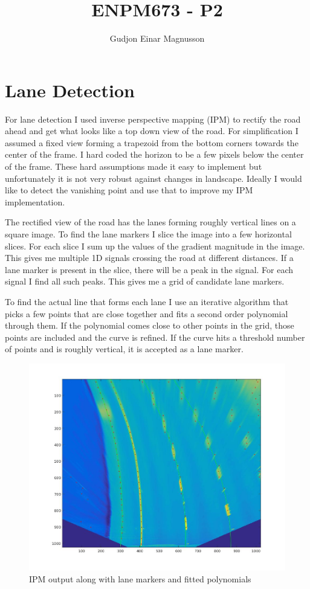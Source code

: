 \documentclass[12pt]{article}
\begin{document}
\title{ENPM673 - P2}
\author{Gudjon Einar Magnusson}

\maketitle

\section{Lane Detection}

For lane detection I used inverse perspective mapping (IPM) to rectify the road ahead and get what looks like a top down view of the road. For simplification I assumed a fixed view forming a trapezoid from the bottom corners towards the center of the frame. I hard coded the horizon to be a few pixels below the center of the frame. These hard assumptions made it easy to implement but unfortunately it is not very robust against changes in landscape. Ideally I would like to detect the vanishing point and use that to improve my IPM implementation.

The rectified view of the road has the lanes forming roughly vertical lines on a square image. To find the lane markers I slice the image into a few horizontal slices. For each slice I sum up the values of the gradient magnitude in the image. This gives me multiple 1D signals crossing the road at different distances. If a lane marker is present in the slice, there will be a peak in the signal. For each signal I find all such peaks. This gives me a grid of candidate lane markers.

To find the actual line that forms each lane I use an iterative algorithm that picks a few points that are close together and fits a second order polynomial through them. If the polynomial comes close to other points in the grid, those points are included and the curve is refined. If the curve hits a threshold number of points and is roughly vertical, it is accepted as a lane marker.


\begin{figure}
    \center
    \includegraphics[width=1.0\linewidth]{img/road}
    \caption{IPM output along with lane markers and fitted polynomials}
    \label{fig_ipm}
\end{figure}
\end{document}
